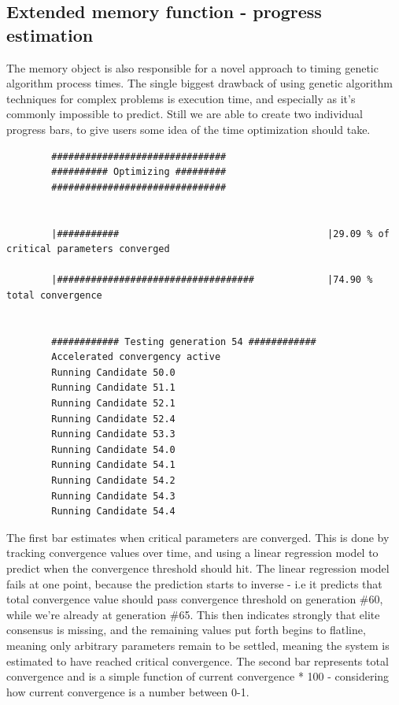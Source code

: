 \documentclass[a4paper,english]{report}
\begin{document}
		\subsection{Extended memory function - progress estimation}
		The memory object is also responsible for a novel approach to timing genetic algorithm process times. The single biggest drawback of using genetic algorithm techniques for complex problems is execution time, and especially as it's commonly impossible to predict. Still we are able to create two individual progress bars, to give users some idea of the time optimization should take.
		\scriptsize
		\begin{verbatim}
		###############################
		########## Optimizing #########
		###############################
		
		
		|###########                                     |29.09 % of critical parameters converged
		
		|###################################             |74.90 % total convergence
		
		
		############ Testing generation 54 ############
		Accelerated convergency active
		Running Candidate 50.0
		Running Candidate 51.1
		Running Candidate 52.1
		Running Candidate 52.4
		Running Candidate 53.3
		Running Candidate 54.0
		Running Candidate 54.1
		Running Candidate 54.2
		Running Candidate 54.3
		Running Candidate 54.4

		\end{verbatim}
		\normalsize
		The first bar estimates when critical parameters are converged. This is done by tracking convergence values over time, and using a linear regression model to predict when the convergence threshold should hit. The linear regression model fails at one point, because the prediction starts to inverse - i.e it predicts that total convergence value should pass convergence threshold on generation \#60, while we're already at generation \#65. This then indicates strongly that elite consensus is missing, and the remaining values put forth begins to flatline, meaning only arbitrary parameters remain to be settled, meaning the system is estimated to have reached critical convergence. The second bar represents total convergence and is a simple function of current convergence * 100 - considering how current convergence is a number between 0-1.
\end{document}
